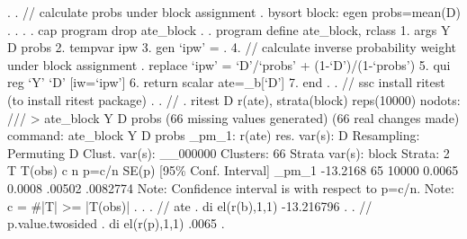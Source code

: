 . 
. // calculate probs under block assignment
. bysort block: egen probs=mean(D)
{\smallskip}
. 
. 
. 
. cap program drop ate_block
{\smallskip}
. 
. program define ate_block, rclass
  1. args Y D probs
  2. tempvar ipw
  3. gen `ipw' = .
  4. // calculate inverse probability weight under block assignment
. replace `ipw' = `D'/`probs' + (1-`D')/(1-`probs')
  5. qui reg `Y' `D' [iw=`ipw']
  6. return scalar ate=_b[`D']
  7. end 
{\smallskip}
. 
. // ssc install ritest (to install ritest package)
. 
. //
. ritest D r(ate), strata(block) reps(10000) nodots: ///
> ate_block Y D probs
(66 missing values generated)
(66 real changes made)
{\smallskip}
      command:  ate_block Y D probs
        _pm_1:  r(ate)
  res. var(s):  D
   Resampling:  Permuting D
Clust. var(s):  __000000
     Clusters:  66
Strata var(s):  block
       Strata:  2
{\smallskip}
T            {\VBAR}     T(obs)       c       n   p=c/n   SE(p) [95\% Conf. Interval]
       _pm_1 {\VBAR}   -13.2168      65   10000  0.0065  0.0008    .00502   .0082774
Note: Confidence interval is with respect to p=c/n.
Note: c = \#{\lbr}|T| >= |T(obs)|{\rbr}
{\smallskip}
. 
. 
. // ate
. di el(r(b),1,1)
-13.216796
{\smallskip}
. 
. // p.value.twosided
. di el(r(p),1,1)
.0065
{\smallskip}
. 
